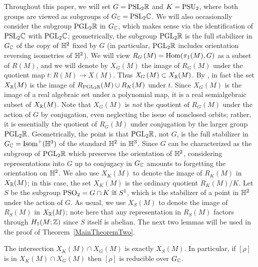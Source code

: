 \documentclass[tikz, sepfignums, defaultenums]{nmd/article}
\newcommand{\G}{G}
\newcommand{\RG}[1]{\mathit{R}_{G}\left(#1\right)}
\newcommand{\XG}[1]{\mathit{X}_{G}\left(#1\right)}
\newcommand{\GC}{G_\C}
\begin{document}
Throughout this paper, we will set $\G = \PSL{2}{\R}$ and
$K = \mathrm{PSU}_2$, where both groups are viewed as subgroups of
$\GC = \PSL{2}{\C}$.  We will also occasionally consider the subgroup
$\mathrm{PGL}_{2} {\mathbb R}$ in $\GC$, which makes sense via the identification of
$\mathrm{PSL}_{2} {\mathbb C}$ with $\mathrm{PGL}_{2} {\mathbb C}$; geometrically, the subgroup
$\mathrm{PGL}_{2} {\mathbb R}$ is the full stabilizer in $\GC$ of the copy of ${\mathbb{H}}^2$
fixed by $G$ (in particular, $\mathrm{PGL}_{2} {\mathbb R}$ includes orientation
reversing isometries of ${\mathbb{H}}^2$).  We will view
$\RG{M} = \Hom(\pi_1(M), G)$ as a subset of $R(M)$, and we will denote
by $\XG{M}$ the image of $\RG{M}$ under the quotient map
$t: R(M) \to X(M)$.  Thus $\XG{M}\subset X_\R(M)$.  By \cite[Lemma
10.1]{HeusenerPorti2004}, in fact the set $X_{\mathbb R}(M)$ is the image of
$R_{\mathrm{PGL}_{2} {\mathbb R}}(M) \cup R_K(M)$ under $t$.  Since $\XG{M}$ is the
image of a real algebraic set under a polynomial map, it is a real
semialgebraic subset of $X_{\mathbb R}(M)$.  Note that $\XG{M}$ is \emph{not}
the quotient of $\RG{M}$ under the action of $\G$ by conjugation, even
neglecting the issue of nonclosed orbits; rather, it is essentially
the quotient of $\RG{M}$ under conjugation by the larger group
$\mathrm{PGL}_{2} {\mathbb R}$.  Geometrically, the point is that $\mathrm{PGL}_{2} {\mathbb R}$, not
$\G$, is the full stabilizer in $\GC = \Isom^+(\H^3)$ of the standard
${\mathbb{H}}^2$ in ${\mathbb{H}}^3$.  Since $G$ can be characterized as the subgroup of
$\mathrm{PGL}_{2} {\mathbb R}$ which preserves the orientation of ${\mathbb{H}}^2$, considering
representations into $\G$ up to conjugacy in $\GC$ amounts to
forgetting the orientation on ${\mathbb{H}}^2$.  We also use $X_K(M)$ to denote
the image of $R_K(M)$ in $X_{\mathbb R}(M)$; in this case, the set $X_K(M)$ is
the ordinary quotient $R_K(M)/K$.  Let $S$ be the subgroup
$\mathrm{PSO}_2 = G \cap K \cong S^1$, which is the stabilizer of a point in
${\mathbb{H}}^2$ under the action of $G$.  As usual, we use $X_S(M)$ to denote
the image of $R_S(M)$ in $X_{\mathbb R}(M)$; note here that any representation
in $R_S(M)$ factors through $H_1(M; {\mathbb Z})$ since $S$ itself is abelian.
The next two lemmas will be used in the proof of
Theorem~\ref{MainTheoremTwo}.

\begin{lemma}\label{lem:real_red}
  The intersection $X_K(M) \cap \XG{M}$ is exactly $X_S(M)$.  In
  particular, if $[\rho]$ is in $X_K(M) \cap \XG{M}$ then $[\rho]$ is
  reducible over $\GC$.
\end{lemma}
\end{document}
